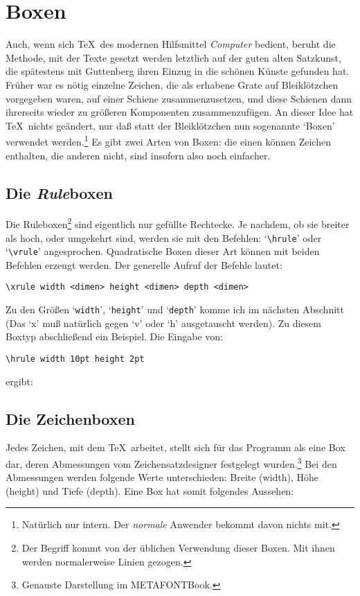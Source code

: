\section{Boxen}
Auch, wenn sich \TeX\ des modernen Hilfsmittel {\em Computer} bedient,
beruht die Methode, mit der Texte gesetzt werden letztlich auf der
guten alten 
Satzkunst, die sp\"atestens mit Guttenberg ihren Einzug in
die sch\"onen K\"unste gefunden hat. Fr\"uher war es n\"otig einzelne Zeichen,
die als erhabene Grate auf Bleikl\"otzchen vorgegeben waren, auf einer
Schiene zusammenzusetzen, und diese Schienen dann ihrerseits wieder zu
gr\"o\ss{}eren Komponenten zusammenzuf\"ugen. An dieser Idee hat \TeX\ nichts
ge\"andert, nur da\ss{} statt der Bleikl\"otzchen nun sogenannte `Boxen'
verwendet werden.\footnote{Nat\"urlich nur intern. Der {\em normale}
Anwender bekommt davon nichts mit.} Es gibt zwei Arten von Boxen: die
einen k\"onnen Zeichen enthalten, die anderen nicht, sind insofern also
noch einfacher.
\subsection{Die {\em Rule}boxen}
Die Ruleboxen\footnote{Der Begriff kommt von der \"ublichen Verwendung
dieser Boxen. Mit ihnen werden normalerweise 
Linien gezogen.} sind
eigentlich nur gef\"ullte Rechtecke. Je nachdem, ob sie breiter als
hoch, oder umgekehrt sind, werden sie mit den Befehlen:
`\verb|\hrule|'
oder 
`\verb|\vrule|' angesprochen. 
Quadratische Boxen dieser Art k\"onnen
mit beiden Befehlen erzeugt werden. Der generelle Aufruf der Befehle
lautet:
\begin{verbatim}
\xrule width <dimen> height <dimen> depth <dimen>
\end{verbatim}
Zu den 
Gr\"o\ss{}en `\verb|width|', `\verb|height|' und `\verb|depth|' komme
ich im n\"achsten Abschnitt (Das `x' mu\ss{} nat\"urlich gegen `v' oder `h'
ausgetauscht werden). Zu diesem Boxtyp abschlie\ss{}end ein Beispiel. Die
Eingabe von:
\begin{verbatim}
\hrule width 10pt height 2pt
\end{verbatim}
ergibt: \vrule width 10pt height 2pt
\subsection{Die Zeichenboxen}
Jedes Zeichen, mit dem \TeX\ arbeitet, stellt sich f\"ur das Programm
als eine Box dar, deren Abmessungen vom Zeichensatzdesigner festgelegt
wurden.\footnote{Genauste Darstellung im 
{\manual METAFONT}Book.} Bei
den Abmessungen werden folgende Werte unterschieden: Breite (width),
H\"ohe (height) und Tiefe (depth). Eine Box hat somit folgendes
Aussehen:

